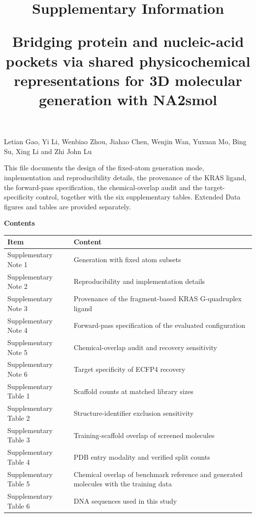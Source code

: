 \documentclass[11pt]{article}
\title{\vspace{-1.2em}\textbf{Supplementary Information}\par\vspace{0.6em}\large Bridging protein and nucleic-acid pockets via shared physicochemical representations for 3D molecular generation with NA2smol}
\date{}
\begin{document}
\maketitle

\begin{center}
{\normalsize Letian Gao, Yi Li, Wenbiao Zhou, Jiahao Chen, Wenjin Wan, Yuxuan Mo, Bing Su, Xing Li and Zhi John Lu}
\end{center}

\vspace{1.0em}
\noindent This file documents the design of the fixed-atom generation mode, implementation and reproducibility details, the provenance of the KRAS ligand, the forward-pass specification, the chemical-overlap audit and the target-specificity control, together with the six supplementary tables. Extended Data figures and tables are provided separately.

\vspace{0.6em}
\noindent\textbf{Contents}
\begin{center}\footnotesize
\begin{tabular}{@{}p{}p{}@{}}
\toprule
\textbf{Item} & \textbf{Content} \\
\midrule
Supplementary Note 1 & Generation with fixed atom subsets \\
Supplementary Note 2 & Reproducibility and implementation details \\
Supplementary Note 3 & Provenance of the fragment-based KRAS G-quadruplex ligand \\
Supplementary Note 4 & Forward-pass specification of the evaluated configuration \\
Supplementary Note 5 & Chemical-overlap audit and recovery sensitivity \\
Supplementary Note 6 & Target specificity of ECFP4 recovery \\
Supplementary Table 1 & Scaffold counts at matched library sizes \\
Supplementary Table 2 & Structure-identifier exclusion sensitivity \\
Supplementary Table 3 & Training-scaffold overlap of screened molecules \\
Supplementary Table 4 & PDB entry modality and verified split counts \\
Supplementary Table 5 & Chemical overlap of benchmark reference and generated molecules with the training data \\
Supplementary Table 6 & DNA sequences used in this study \\
\bottomrule
\end{tabular}\end{center}
\clearpage


\clearpage


\clearpage

\end{document}
